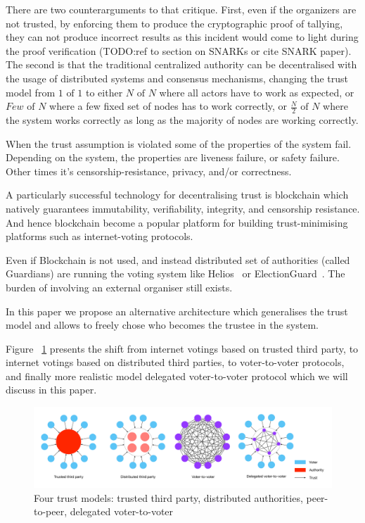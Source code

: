 \documentclass{article}
\begin{document}
There are two counterarguments to that critique. 
First, even if the organizers are not trusted, by enforcing them to produce the cryptographic proof of tallying, they can not produce incorrect results as this incident would come to light during the proof verification (TODO:ref to section on SNARKs or cite SNARK paper).
The second is that the traditional centralized authority can be decentralised with the usage of distributed systems and consensus mechanisms, changing the trust model from $1 \textrm{ of } 1$ to either $N \textrm{ of } N$ where all actors have to work as expected, or $Few \textrm{ of } N$ where a few fixed set of nodes has to work correctly, or $\frac{N}{2} \textrm{ of } N$ where the system works correctly as long as the majority of nodes are working correctly. 

When the trust assumption is violated some of the properties of the system fail. Depending on the system, the properties are liveness failure, or safety failure. Other times it's censorship-resistance, privacy, and/or correctness.

A particularly successful technology for decentralising trust is blockchain which natively guarantees immutability, verifiability, integrity, and censorship resistance. And hence blockchain become a popular platform for building trust-minimising platforms such as internet-voting protocols.

Even if Blockchain is not used, and instead distributed set of authorities (called Guardians) are running the voting system like Helios~\cite{adidaHeliosWebbasedOpenAudit2008} or ElectionGuard~\cite{ElectionGuard}. The burden of involving an external organiser still exists.


In this paper we propose an alternative architecture which generalises the trust model and allows to freely chose who becomes the trustee in the system. 

Figure ~\ref{fig:trust-models} presents the shift from internet votings based on trusted third party, to internet votings based on distributed third parties, to voter-to-voter protocols, and finally more realistic model delegated voter-to-voter protocol which we will discuss in this paper.

\begin{figure}
    \centering
    \includegraphics[width=\textwidth]{trust-models-voting.pdf}
    \caption{Four trust models: trusted third party, distributed authorities, peer-to-peer, delegated voter-to-voter}
    \label{fig:trust-models}
\end{figure}
\end{document}

